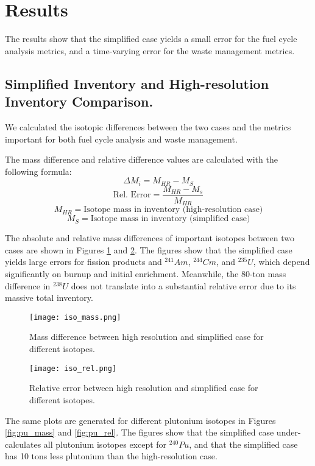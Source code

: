 \documentclass{anstrans}
\begin{document}
\section{Results}
The results show that the simplified case yields a small
error for the fuel cycle analysis metrics, and a time-varying
error for the waste management metrics.

\subsection{Simplified Inventory and High-resolution Inventory Comparison.}
We calculated the isotopic differences between the two cases
and the metrics important for both fuel cycle analysis
and waste management.

The mass difference and relative difference values are calculated
with the following formula:
\[\Delta M_i = M_{HR} - M_{S} \]
\[\text{Rel. Error} = \frac{M_{HR} - M_{s}}{M_{HR}}\]
\[M_{HR} = \text{Isotope mass in inventory (high-resolution case)}\]
\[M_{S} = \text{Isotope mass in inventory (simplified case)}\]

The absolute and relative mass differences
of important isotopes between two cases are shown in
Figures \ref{fig:iso_mass} and \ref{fig:iso_rel}. 
The figures show that the simplified case yields
large errors for fission products and $^{241}Am$, $^{244}Cm$, and $^{235}U$,
which depend significantly on burnup and initial enrichment.
Meanwhile, the 80-ton mass difference in $^{238}U$ does not
translate into a substantial relative error due to its massive
total inventory.

\begin{figure}
    \centering
    \texttt{[image: iso\_mass.png]}
    \caption{Mass difference between high resolution and simplified case for different isotopes.}
    \label{fig:iso_mass}
\end{figure}

\begin{figure}
    \centering
    \texttt{[image: iso\_rel.png]}
    \caption{Relative error between high resolution and simplified case for different isotopes.}
    \label{fig:iso_rel}
\end{figure}

The same plots are generated for different plutonium
isotopes in Figures \ref{fig:pu_mass} and \ref{fig:pu_rel}.
The figures show that the simplified case under-calculates
all plutonium isotopes except for $^{240}Pu$, and that the
simplified case has 10 tons less plutonium than the
high-resolution case.
\end{document}
